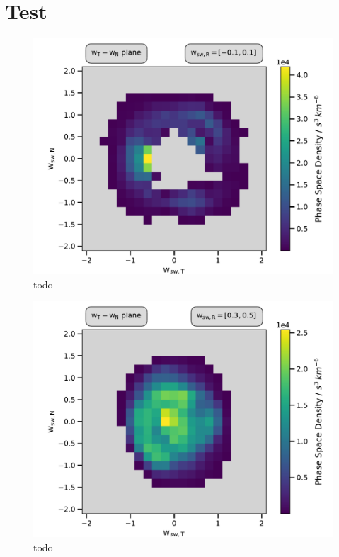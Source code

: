 
\chapter{Test} %

\label{AppendixX} %



\begin{figure}[h]
	\includegraphics[width=1.\textwidth]{Figures/cart_50_step-1.pdf}
	\centering
	\caption{todo}
	\label{fig:todo}
\end{figure}

\begin{figure}[h]
	\includegraphics[width=1.\textwidth]{Figures/cart_50_ps_R.pdf}
	\centering
	\caption{todo}
	\label{fig:todo}
\end{figure}

